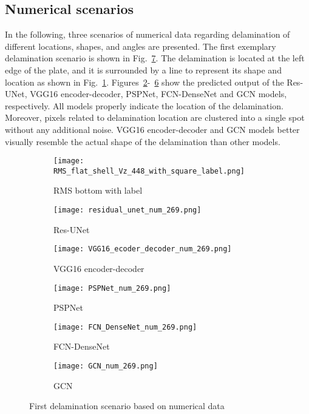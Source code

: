 \subsection{Numerical scenarios}
In the following, three scenarios of numerical data regarding delamination of different locations, shapes, and angles are presented. 
The first exemplary delamination scenario is shown in Fig.~\ref{fig:softmax_448}. 
The delamination is located at the left edge of the plate, and it is surrounded by a line to represent its shape and location as shown in Fig.~\ref{fig:RMS_flat_shell_Vz_448}.
Figures~\ref{fig:unet_pred_448}-~\ref{fig:gcn_pred_448} show the predicted output of the Res-UNet, VGG16 encoder-decoder, PSPNet, FCN-DenseNet and GCN models, respectively. 
All models properly indicate the location of the delamination. 
Moreover, pixels related to delamination location are clustered into a single spot without any additional noise. 
VGG16 encoder-decoder and GCN models better visually resemble the actual shape of the delamination than other models.
\begin{figure}[!h]
	\centering
	\begin{subfigure}[b]{0.47\textwidth}
		\centering
		\texttt{[image: RMS\_flat\_shell\_Vz\_448\_with\_square\_label.png]}
		\caption{RMS bottom with label}
		\label{fig:RMS_flat_shell_Vz_448}
	\end{subfigure}
	\hfill
	\begin{subfigure}[b]{0.47\textwidth}
		\centering
		\texttt{[image: residual\_unet\_num\_269.png]}
		\caption{Res-UNet}
		\label{fig:unet_pred_448}
	\end{subfigure}
	\hfill
	\begin{subfigure}[b]{0.47\textwidth}
		\centering
		\texttt{[image: VGG16\_ecoder\_decoder\_num\_269.png]}
		\caption{VGG16 encoder-decoder}
		\label{fig:vgg16_pred_448}
	\end{subfigure}
	\hfill
	\begin{subfigure}[b]{0.47\textwidth}
		\centering
		\texttt{[image: PSPNet\_num\_269.png]}
		\caption{PSPNet}
		\label{fig:pspnet_pred_448}
	\end{subfigure}
	\hfill
	\begin{subfigure}[b]{0.47\textwidth}
		\centering
		\texttt{[image: FCN\_DenseNet\_num\_269.png]}
		\caption{FCN-DenseNet}
		\label{fig:fcn_densenet_pred_448}
	\end{subfigure}
	\hfill
	\begin{subfigure}[b]{0.47\textwidth}
		\centering
		\texttt{[image: GCN\_num\_269.png]}
		\caption{GCN}
		\label{fig:gcn_pred_448}
	\end{subfigure}
	\caption{First delamination scenario based on numerical data}
	\label{fig:softmax_448}
\end{figure} 
